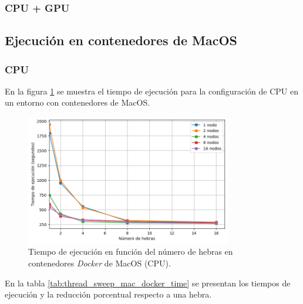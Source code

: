 \subsubsection{CPU + GPU}

\subsection{Ejecución en contenedores de MacOS}
\subsubsection{CPU}

En la figura \ref{fig:thread_sweep_mac_docker_time} se muestra el tiempo de ejecución para la configuración de CPU en un entorno con contenedores de MacOS.

\begin{figure}[ht]
    \centering
    \includegraphics[width=0.8\textwidth]{imagenes/cap5/thread_sweep_mac_docker_time.png}
    \caption{Tiempo de ejecución en función del número de hebras en contenedores \textit{Docker} de MacOS (CPU).}
    \label{fig:thread_sweep_mac_docker_time}
\end{figure}

En la tabla \ref{tab:thread_sweep_mac_docker_time} se presentan los tiempos de ejecución y la reducción porcentual respecto a una hebra.

